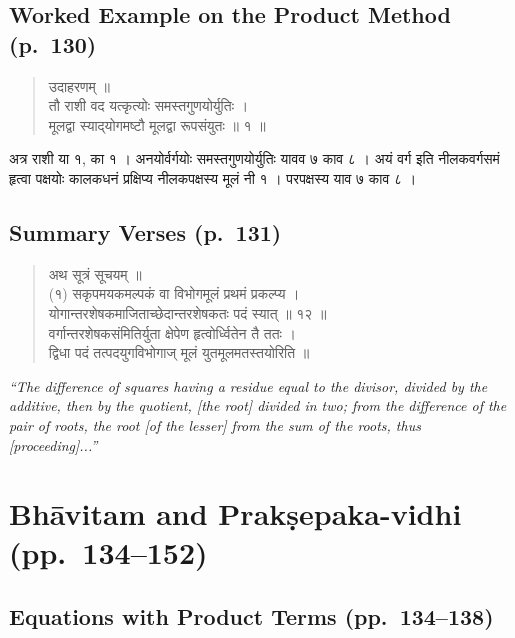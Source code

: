 \documentclass[11pt,a4paper]{article}
\newcommand{\cnote}[1]{\textcolor{notecolor}{\textit{#1}}}
\newcommand{\dev}[1]{{\devanagarifont #1}}
\newenvironment{sanskritverse}{%
  \begin{verse}
}{%
  \end{verse}
}
\begin{document}
\subsection*{Worked Example on the Product Method (p.\ 130)}

\begin{sanskritverse}
\dev{%
उदाहरणम् ॥\\[0.3em]
तौ राशी वद यत्कृत्योः समस्तगुणयोर्युतिः ।\\
मूलद्वा स्याद्‌योगमष्टौ मूलद्वा रूपसंयुतः ॥ १ ॥}
\end{sanskritverse}

\dev{%
अत्र राशी या १, का १ । अनयोर्वर्गयोः समस्तगुणयोर्युतिः यावव ७ काव ८ । अयं वर्ग इति नीलकवर्गसमं हृत्वा पक्षयोः कालकधनं प्रक्षिप्य नीलकपक्षस्य मूलं नी १ । परपक्षस्य याव ७ काव ८ ।}

\subsection*{Summary Verses (p.\ 131)}

\begin{sanskritverse}
\dev{%
अथ सूत्रं सूचयम् ॥\\[0.5em]
(१) सकृपमयकमल्पकं वा विभोगमूलं प्रथमं प्रकल्प्य ।\\
योगान्तरशेषकमाजिताच्छेदान्तरशेषकतः पदं स्यात् ॥ १२ ॥\\[0.5em]
वर्गान्तरशेषकसंमितिर्युता क्षेपेण हृत्वोर्ध्वितेन तै ततः ।\\
द्विधा पदं तत्पदयुगविभोगाज् मूलं युतमूलमतस्तयोरिति ॥}
\end{sanskritverse}

\cnote{``The difference of squares having a residue equal to the divisor, divided by the additive, then by the quotient, [the root] divided in two; from the difference of the pair of roots, the root [of the lesser] from the sum of the roots, thus [proceeding]...''}

\section{Bhāvitam and Prakṣepaka-vidhi (pp.\ 134--152)}
\label{sec:bhavitam}

\subsection{Equations with Product Terms (pp.\ 134--138)}
\end{document}
